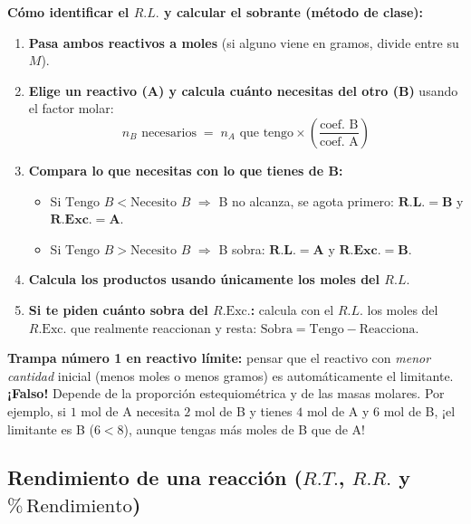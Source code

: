 \documentclass[12pt, letterpaper]{article}
\newcommand{\pc}{\text{\%}}
\begin{document}
\begin{cuadropasos}[nobreak=true]
  \textbf{Cómo identificar el $R.L.$ y calcular el sobrante (método de clase):}
  \begin{enumerate}[leftmargin=*, nosep, topsep=3pt]
    \item \textbf{Pasa ambos reactivos a moles} (si alguno viene en gramos, divide entre su $M$).
    \item \textbf{Elige un reactivo (A) y calcula cuánto necesitas del otro (B)} usando el factor molar:
          \[
            n_B\text{ necesarios} \;=\; n_A\text{ que tengo} \times \left(\frac{\text{coef. B}}{\text{coef. A}}\right)
          \]
    \item \textbf{Compara lo que necesitas con lo que tienes de B:}
          \begin{itemize}[leftmargin=*, nosep, topsep=2pt]
            \item Si $\text{Tengo } B < \text{Necesito } B$ $\Longrightarrow$ B no alcanza, se agota primero: $\mathbf{R.L. = B}$ y $\mathbf{R.\text{Exc.} = A}$.
            \item Si $\text{Tengo } B > \text{Necesito } B$ $\Longrightarrow$ B sobra: $\mathbf{R.L. = A}$ y $\mathbf{R.\text{Exc.} = B}$.
          \end{itemize}
    \item \textbf{Calcula los productos usando únicamente los moles del $R.L.$}
    \item \textbf{Si te piden cuánto sobra del $R.\text{Exc.}$:} calcula con el $R.L.$ los moles del $R.\text{Exc.}$ que realmente reaccionan y resta:
          $\text{Sobra} = \text{Tengo} - \text{Reacciona}$.
  \end{enumerate}
\end{cuadropasos}

\begin{cuadroadvertencia}[nobreak=true]
  \textbf{Trampa número 1 en reactivo límite:} pensar que el reactivo con \emph{menor cantidad} inicial (menos moles o menos gramos) es automáticamente el limitante. \textbf{¡Falso!} Depende de la proporción estequiométrica y de las masas molares. Por ejemplo, si $1\text{ mol}$ de A necesita $2\text{ mol}$ de B y tienes $4\text{ mol}$ de A y $6\text{ mol}$ de B, ¡el limitante es B ($6 < 8$), aunque tengas más moles de B que de A!
\end{cuadroadvertencia}

\subsection{Rendimiento de una reacción ($R.T.$, $R.R.$ y $\pc\,\text{Rendimiento}$)}
\end{document}
